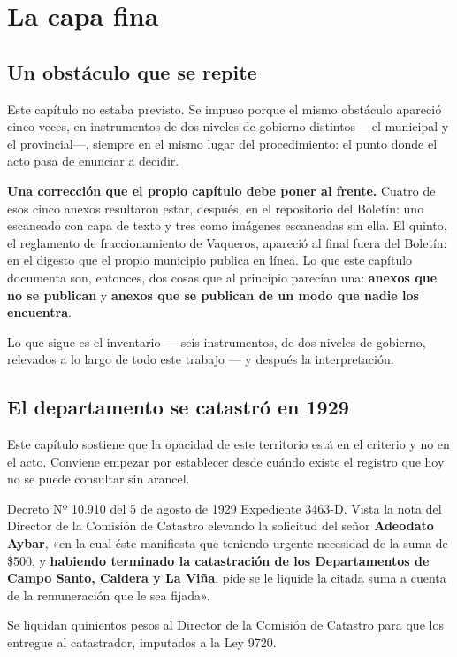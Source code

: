 \chapter{La capa fina}

\label{cap:opacidad}
\section{Un obstáculo que se repite}

Este capítulo no estaba previsto. Se impuso porque el mismo obstáculo apareció cinco veces, en instrumentos de dos niveles de gobierno distintos ---el municipal y el provincial---, siempre en el mismo lugar del procedimiento: el punto donde el acto pasa de enunciar a decidir.

\textbf{Una corrección que el propio capítulo debe poner al frente.} Cuatro de esos cinco anexos resultaron estar, después, en el repositorio del Boletín: uno escaneado con capa de texto y tres como imágenes escaneadas sin ella. El quinto, el reglamento de fraccionamiento de Vaqueros, apareció al final fuera del Boletín: en el digesto que el propio municipio publica en línea. Lo que este capítulo documenta son, entonces, dos cosas que al principio parecían una: \textbf{anexos que no se publican} y \textbf{anexos que se publican de un modo que nadie los encuentra}.

Lo que sigue es el inventario --- seis instrumentos, de dos niveles de gobierno, relevados a lo largo de todo este trabajo --- y después la interpretación.

\section{El departamento se catastró en 1929}

Este capítulo sostiene que la opacidad de este territorio está en el criterio y no en el
acto. Conviene empezar por establecer desde cuándo existe el registro que hoy no se puede
consultar sin arancel.

\begin{ficha}{Decreto Nº 10.910 del 5 de agosto de 1929}
Expediente 3463-D. Vista la nota del Director de la Comisión de Catastro elevando la
solicitud del señor \textbf{Adeodato Aybar}, «en la cual éste manifiesta que teniendo
urgente necesidad de la suma de \$500, y \textbf{habiendo terminado la catastración de los
Departamentos de Campo Santo, Caldera y La Viña}, pide se le liquide la citada suma a
cuenta de la remuneración que le sea fijada».

Se liquidan quinientos pesos al Director de la Comisión de Catastro para que los entregue
al catastrador, imputados a la Ley 9720.
\end{ficha}

